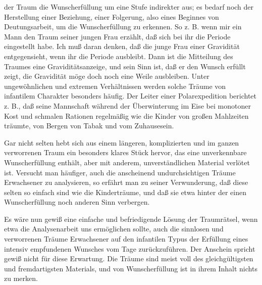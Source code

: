 \documentclass{article}
\begin{document}
         
            
            
            
        \pstart
        der Traum die Wunscherfüllung um eine Stufe indirekter aus; es
               bedarf noch der Herstellung einer Beziehung, einer Folgerung, also eines
               Beginnes von Deutungsarbeit, um die Wunscherfüllung zu erkennen. So z. B. wenn
               mir ein Mann den Traum seiner jungen Frau erzählt, daß sich bei ihr die Periode
               eingestellt habe. Ich muß daran denken, daß die junge Frau einer Gravidität
                  entgegensieht, wenn ihr die Periode ausbleibt. Dann ist die Mitteilung des Traumes eine Graviditätsanzeige, und sein Sinn ist,
               daß er den Wunsch erfüllt zeigt, die Gravidität möge doch noch eine Weile
               ausbleiben. Unter ungewöhnlichen und extremen Verhältnissen werden
               solche Träume von infantilem Charakter besonders häufig. Der Leiter einer
               Polarexpedition berichtet z. B., daß seine Mannschaft während der Überwinterung
               im Eise bei monotoner Kost und schmalen Rationen regelmäßig wie die Kinder
               von großen Mahlzeiten träumte, von Bergen von Tabak und vom Zuhausesein.
        \pend
    
            
        \pstart
        Gar nicht selten hebt sich aus einem längeren, komplizierten und im ganzen
               verworrenen Traum ein besonders klares Stück hervor, das eine unverkennbare
               Wunscherfüllung enthält, aber mit anderem, unverständlichen Material verlötet
               ist. Versucht man häufiger, auch die anscheinend undurchsichtigen Träume
               Erwachsener zu analysieren, so erfährt man zu seiner Verwunderung,
               daß diese selten so einfach sind wie die Kinderträume, und daß sie etwa hinter
               der einen Wunscherfüllung noch anderen Sinn verbergen.
        \pend
    
            
        \pstart
        Es wäre nun gewiß eine einfache und befriedigende Lösung der Traumrätsel, wenn
               etwa die Analysenarbeit uns ermöglichen sollte, auch die sinnlosen und
               verworrenen Träume Erwachsener auf den infantilen Typus der Erfüllung eines
               intensiv empfundenen Wunsches vom Tage zurückzuführen. Der Anschein
               spricht gewiß nicht für diese Erwartung. Die Träume sind meist voll des
               gleichgültigsten und fremdartigsten Materials, und von Wunscherfüllung ist in
               ihrem Inhalt nichts zu merken.
        \pend
    
\end{document}
